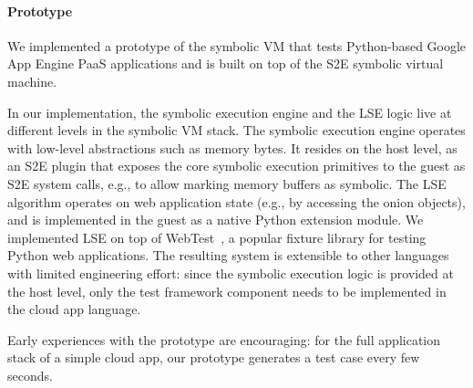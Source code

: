 \paragraph{Prototype}

We implemented a prototype of the symbolic VM that tests Python-based Google App Engine PaaS applications and is built on top of the S2E symbolic virtual machine.

In our implementation, the symbolic execution engine and the LSE logic live at different levels in the symbolic VM stack.
%
The symbolic execution engine operates with low-level abstractions such as memory bytes. It resides on the host level, as an S2E plugin that exposes the core symbolic execution primitives to the guest as S2E system calls, e.g., to allow marking memory buffers as symbolic.
%
The LSE algorithm operates on web application state (e.g., by accessing the onion objects), and is implemented in the guest as a native Python extension module.  We implemented LSE on top of WebTest~\cite{py-webtest}, a popular fixture library for testing Python web applications.
%
The resulting system is extensible to other languages with limited engineering effort: since the symbolic execution logic is provided at the host level, only the test framework component needs to be implemented in the cloud app language.

Early experiences with the prototype are encouraging: for the full application stack of a simple cloud app, our prototype generates a test case every few seconds.

